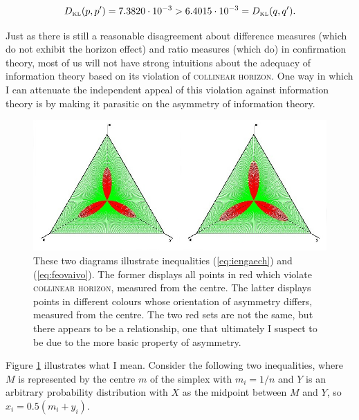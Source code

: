 \documentclass[12pt]{article}
\begin{document}
\begin{equation}
  \label{eq:eiloothu}
  D_{\mbox{\tiny KL}}(p,p')=7.3820\cdot{}10^{-3}>6.4015\cdot{}10^{-3}=D_{\mbox{\tiny KL}}(q,q').
\end{equation}

Just as there is still a reasonable disagreement about difference
measures (which do not exhibit the horizon effect) and ratio measures
(which do) in confirmation theory, most of us will not have strong
intuitions about the adequacy of information theory based on its
violation of \textsc{collinear horizon}. One way in which I can
attenuate the independent appeal of this violation against information
theory is by making it parasitic on the asymmetry of information
theory.

\begin{figure}[H]
  \begin{flushright}
    \begin{minipage}[h]{\linewidth}
     \includegraphics[width=\textwidth]{fleur-concat-edited.png}
      \caption{\footnotesize These two diagrams illustrate
        inequalities (\ref{eq:iengaech}) and (\ref{eq:feovaivo}). The
        former displays all points in red which violate
        \textsc{collinear horizon}, measured from the centre. The
        latter displays points in different colours whose orientation
        of asymmetry differs, measured from the centre. The two red
        sets are not the same, but there appears to be a relationship,
        one that ultimately I suspect to be due to the more basic
        property of asymmetry.}
      \label{fig:eeghoomo}
    \end{minipage}
  \end{flushright}
\end{figure}

Figure \ref{fig:eeghoomo} illustrates what I mean. Consider the
following two inequalities, where $M$ is represented by the centre
$m$ of the simplex with $m_{i}=1/n$ and $Y$ is an arbitrary
probability distribution with $X$ as the midpoint between $M$ and $Y$,
so $x_{i}=0.5(m_{i}+y_{i})$.
\end{document}
